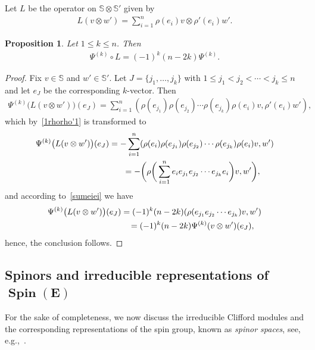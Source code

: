 \documentclass[10pt,a4paper]{amsart}
\DeclareMathOperator{\Spin}{Spin}
\numberwithin{equation}{section}
\newtheorem{prop}[theor]{Proposition}
\begin{document}
Let $L$ be the operator on $\mathbb S \otimes \mathbb S' $ given by
\begin{gather*}
L(v\otimes w')= \sum_{i=1}^n \rho(e_i)v\otimes \rho'(e_i)w' .
\end{gather*}

\begin{prop} Let $1\leq k\leq n$. Then
\begin{gather}\label{rhorho'3}
\Psi^{(k)} \circ L = (-1)^k (n-2k) \Psi^{(k)} .
\end{gather}
\end{prop}

\begin{proof}
Fix $v\in \mathbb S$ and $w'\in \mathbb S'$. Let $J=\{j_1,\ldots, j_k \}$ with $1\leq j_1<j_2<\cdots <j_k\leq n$ and let $e_J$ be the corresponding $k$-vector.
Then
\begin{gather*}
\Psi^{(k)} \big(L(v\otimes w')\big) (e_J) = \sum_{i=1}^n (\rho(e_{j_1}) \rho(e_{j_2}) \cdots \rho(e_{j_k}) \rho(e_i)v, \rho'(e_i)w'),
\end{gather*}
which by~\eqref{1rhorho'1} is transformed to
\begin{gather*}
\Psi^{(k)} \big(L(v\otimes w')\big) (e_J)=- \sum_{i=1}^n (\rho(e_i) \rho(e_{j_1}) \rho(e_{j_2}) \cdots \rho(e_{j_k}) \rho(e_i)v,w')
\\ \hphantom{\Psi^{(k)} \big(L(v\otimes w')\big) (e_J)}
{}= -\bigg(\rho\bigg(\sum_{i=1}^n e_ie_{j_1} e_{j_2} \cdots e_{j_k} e_i\bigg) v,w'\bigg),
\end{gather*}
and according to~\eqref{sumeiei} we have
\begin{gather*}
\Psi^{(k)} \big(L(v\otimes w')\big) (e_J) = (-1)^k(n-2k) (\rho(e_{j_1} e_{j_2} \cdots e_{j_k}) v,w')
\\ \hphantom{\Psi^{(k)} \big(L(v\otimes w')\big) (e_J)}
{}= (-1)^k (n-2k) \Psi^{(k)}(v\otimes w')(e_J),
\end{gather*}
hence, the conclusion follows.
\end{proof}

\subsection[Spinors and irreducible representations of Spin(E)]
{Spinors and irreducible representations of $\boldsymbol{\Spin(E)}$}

For the sake of completeness, we now discuss the irreducible Clifford modules and the corresponding representations of the spin group, known as \emph{spinor spaces}, see, e.g.,~\cite{dss, deligne, kn}.
\end{document}
